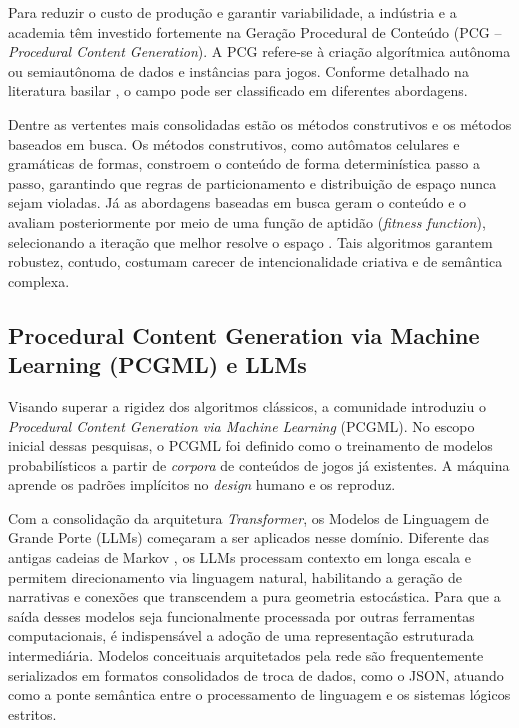 Para reduzir o custo de produção e garantir variabilidade, a indústria e a academia têm investido fortemente na Geração Procedural de Conteúdo (PCG -- \textit{Procedural Content Generation}). A PCG refere-se à criação algorítmica autônoma ou semiautônoma de dados e instâncias para jogos. Conforme detalhado na literatura basilar \cite{pcgbook}, o campo pode ser classificado em diferentes abordagens.

Dentre as vertentes mais consolidadas estão os métodos construtivos e os métodos baseados em busca. Os métodos construtivos, como autômatos celulares e gramáticas de formas, constroem o conteúdo de forma determinística passo a passo, garantindo que regras de particionamento e distribuição de espaço nunca sejam violadas. Já as abordagens baseadas em busca geram o conteúdo e o avaliam posteriormente por meio de uma função de aptidão (\textit{fitness function}), selecionando a iteração que melhor resolve o espaço \cite{pcgbook}. Tais algoritmos garantem robustez, contudo, costumam carecer de intencionalidade criativa e de semântica complexa.

\subsection{Procedural Content Generation via Machine Learning (PCGML) e LLMs}
\label{sec:pcgml}

Visando superar a rigidez dos algoritmos clássicos, a comunidade introduziu o \textit{Procedural Content Generation via Machine Learning} (PCGML). No escopo inicial dessas pesquisas, o PCGML foi definido \cite{summerville2018procedural} como o treinamento de modelos probabilísticos a partir de \textit{corpora} de conteúdos de jogos já existentes. A máquina aprende os padrões implícitos no \textit{design} humano e os reproduz.

Com a consolidação da arquitetura \textit{Transformer}, os Modelos de Linguagem de Grande Porte (LLMs) começaram a ser aplicados nesse domínio. Diferente das antigas cadeias de Markov \cite{summerville2018procedural}, os LLMs processam contexto em longa escala e permitem direcionamento via linguagem natural, habilitando a geração de narrativas e conexões que transcendem a pura geometria estocástica. Para que a saída desses modelos seja funcionalmente processada por outras ferramentas computacionais, é indispensável a adoção de uma representação estruturada intermediária. Modelos conceituais arquitetados pela rede são frequentemente serializados em formatos consolidados de troca de dados, como o JSON, atuando como a ponte semântica entre o processamento de linguagem e os sistemas lógicos estritos.

